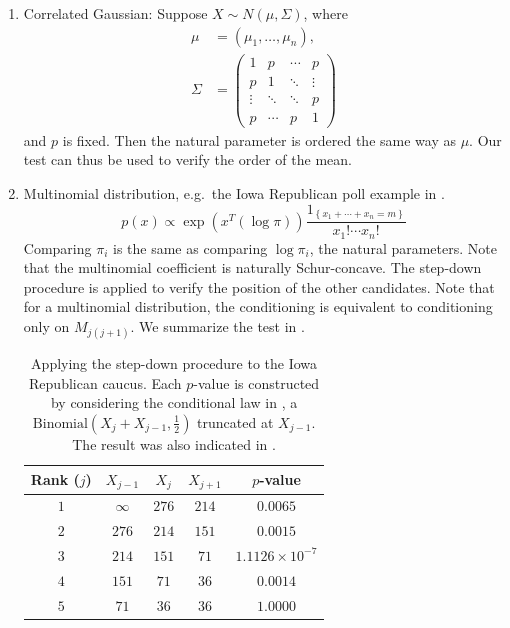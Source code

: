 \documentclass[11pt]{article}
\begin{document}
\begin{enumerate}

\item Correlated Gaussian: Suppose $X \sim N\left(\mu, \Sigma\right)$, where
\begin{align*}
\mu & = \left(\mu_1, \ldots, \mu_n\right), \\
\Sigma & = \begin{pmatrix}
1 & p & \cdots & p \\
p & 1 & \ddots & \vdots \\
\vdots & \ddots & \ddots & p \\
p & \cdots & p & 1
\end{pmatrix}
\end{align*}
and $p$ is fixed. Then the natural parameter is ordered the same way as $\mu$. Our test can thus be used to verify the order of the mean.

\item Multinomial distribution, e.g.\ the Iowa Republican poll example in .
$$p\left(x\right) \propto \exp\left(x^T \left(\log \pi\right)\right) \frac{1_{\left\{x_1 + \cdots + x_n = m\right\}}}{x_1! \cdots x_n!}$$
Comparing $\pi_i$ is the same as comparing $\log \pi_i$, the natural parameters. Note that the multinomial coefficient is naturally Schur-concave. The step-down procedure is applied to verify the position of the other candidates. Note that for a multinomial distribution, the conditioning  is equivalent to conditioning only on $M_{j\left(j+1\right)}$. We summarize the test in .

\begin{table}[htbp]
\begin{center}
\begin{tabular}{c c c c c}
\hline
Rank ($j$) & $X_{j-1}$ & $X_j$ & $X_{j+1}$ & $p$-value \\
\hline
$1$ & $\infty$ & $276$ & $214$ & $0.0065$ \\
$2$ & $276$ & $214$ & $151$ & $0.0015$ \\
$3$ & $214$ & $151$ & $71$ & $1.1126 \times 10^{-7}$ \\
$4$ & $151$ & $71$ & $36$ & $0.0014$ \\
$5$ & $71$ & $36$ & $36$ & $1.0000$ \\
\hline
\end{tabular}
\end{center}
\caption{Applying the step-down procedure to the Iowa Republican caucus. Each $p$-value is constructed by considering the conditional law in , a $\text{Binomial}\left(X_j + X_{j-1}, \frac{1}{2}\right)$ truncated at $X_{j-1}$. The result was also indicated in .}
\label{tbl:poll_analysis}
\end{table}


\end{enumerate}
\end{document}
